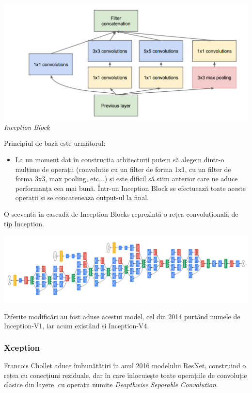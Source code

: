 \begin{center}
\includegraphics[scale=0.4]{inceptionBlock} \\
\textit{Inception Block}
\end{center}

Principiul de bază este următorul:

\begin{itemize}
\item La un moment dat în construcția arhitecturii putem să alegem dintr-o mulțime de operații (convolutie cu un filter de forma 1x1, cu un filter de forma 3x3, max pooling, etc...) și este dificil să stim anterior care ne aduce performanța cea mai bună. Într-un Inception Block se efectuează toate aceste operații și se concateneaza output-ul la final.
\end{itemize} 

O secventă în cascadă de Inception Blocks reprezintă o rețea convoluțională de tip Inception. \cite{inception}

\begin{center}
\includegraphics[scale=0.7]{inception}
\end{center}

Diferite modificări au fost aduse acestui model, cel din 2014 purtând numele de Inception-V1, iar acum existând și Inception-V4.

\subsubsection{Xception}
Francois Chollet aduce îmbunătățiri în anul 2016 modelului ResNet, construind o rețea cu conecțiuni reziduale, dar în care înlocuiește toate operațiile de convoluție clasice din layere, cu operații numite \textit{Deapthwise Separable Convolution}. \cite{xception}

